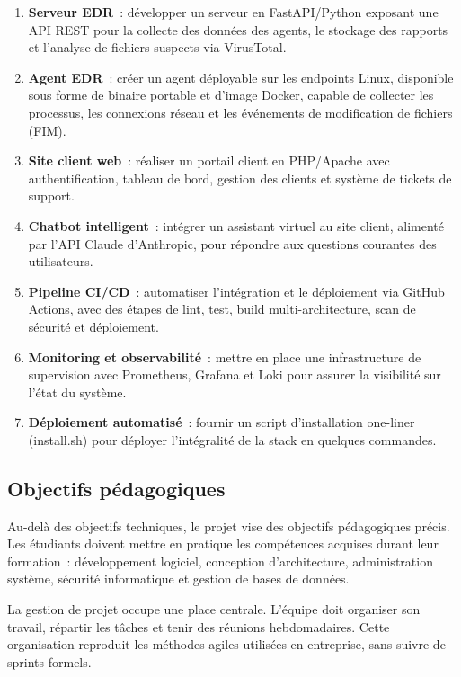 \begin{enumerate}
  \item \textbf{Serveur EDR}~: développer un serveur en FastAPI/Python
    exposant une API REST pour la collecte des données des agents, le
    stockage des rapports et l'analyse de fichiers suspects via
    VirusTotal.
  \item \textbf{Agent EDR}~: créer un agent déployable sur les endpoints
    Linux, disponible sous forme de binaire portable et d'image Docker,
    capable de collecter les processus, les connexions réseau et les
    événements de modification de fichiers (FIM).
  \item \textbf{Site client web}~: réaliser un portail client en
    PHP/Apache avec authentification, tableau de bord, gestion des
    clients et système de tickets de support.
  \item \textbf{Chatbot intelligent}~: intégrer un assistant virtuel au
    site client, alimenté par l'API Claude d'Anthropic, pour répondre
    aux questions courantes des utilisateurs.
  \item \textbf{Pipeline CI/CD}~: automatiser l'intégration et le
    déploiement via GitHub Actions, avec des étapes de lint, test, build
    multi-architecture, scan de sécurité et déploiement.
  \item \textbf{Monitoring et observabilité}~: mettre en place une
    infrastructure de supervision avec Prometheus, Grafana et Loki pour
    assurer la visibilité sur l'état du système.
  \item \textbf{Déploiement automatisé}~: fournir un script d'installation
    one-liner (install.sh) pour déployer l'intégralité de la stack en
    quelques commandes.
\end{enumerate}

\subsection{Objectifs pédagogiques}

Au-delà des objectifs techniques, le projet vise des objectifs
pédagogiques précis. Les étudiants doivent mettre en pratique les
compétences acquises durant leur formation~: développement logiciel,
conception d'architecture, administration système, sécurité
informatique et gestion de bases de données.

La gestion de projet occupe une place centrale. L'équipe doit organiser
son travail, répartir les tâches et tenir des réunions hebdomadaires.
Cette organisation reproduit les méthodes agiles utilisées en
entreprise, sans suivre de sprints formels.

